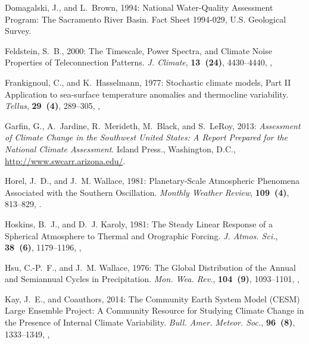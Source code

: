 \documentclass[final, double]{ua-thesis}
\begin{document}
\begin{thebibliography}{}
Domagalski, J., and L.~Brown, 1994: National {Water}-{Quality} {Assessment}
  {Program}: {The} {Sacramento} {River} {Basin}. Fact {Sheet} 1994-029, U.S.
  Geological Survey.

Feldstein, S.~B., 2000: The {Timescale}, {Power} {Spectra}, and {Climate}
  {Noise} {Properties} of {Teleconnection} {Patterns}. \textit{J. Climate},
  \textbf{13~(24)}, 4430--4440,
  ,

Frankignoul, C., and K.~Hasselmann, 1977: Stochastic climate models, {Part}
  {II} {Application} to sea-surface temperature anomalies and thermocline
  variability. \textit{Tellus}, \textbf{29~(4)}, 289--305,
  ,

Garfin, G., A.~Jardine, R.~Merideth, M.~Black, and S.~LeRoy, 2013:
  \textit{Assessment of {Climate} {Change} in the {Southwest} {United}
  {States}: {A} {Report} {Prepared} for the {National} {Climate} {Assessment}}.
  Island Press., Washington, D.C.,
  \urlprefix\url{http://www.swcarr.arizona.edu/}.

Horel, J.~D., and J.~M. Wallace, 1981: Planetary-{Scale} {Atmospheric}
  {Phenomena} {Associated} with the {Southern} {Oscillation}. \textit{Monthly
  Weather Review}, \textbf{109~(4)}, 813--829,
  .

Hoskins, B.~J., and D.~J. Karoly, 1981: The {Steady} {Linear} {Response} of a
  {Spherical} {Atmosphere} to {Thermal} and {Orographic} {Forcing}. \textit{J.
  Atmos. Sci.}, \textbf{38~(6)}, 1179--1196,
  ,

Hsu, C.-P.~F., and J.~M. Wallace, 1976: The {Global} {Distribution} of the
  {Annual} and {Semiannual} {Cycles} in {Precipitation}. \textit{Mon. Wea.
  Rev.}, \textbf{104~(9)}, 1093--1101,
  ,

Kay, J.~E., and Coauthors, 2014: The {Community} {Earth} {System} {Model}
  ({CESM}) {Large} {Ensemble} {Project}: {A} {Community} {Resource} for
  {Studying} {Climate} {Change} in the {Presence} of {Internal} {Climate}
  {Variability}. \textit{Bull. Amer. Meteor. Soc.}, \textbf{96~(8)},
  1333--1349, ,


\end{thebibliography}
\end{document}

